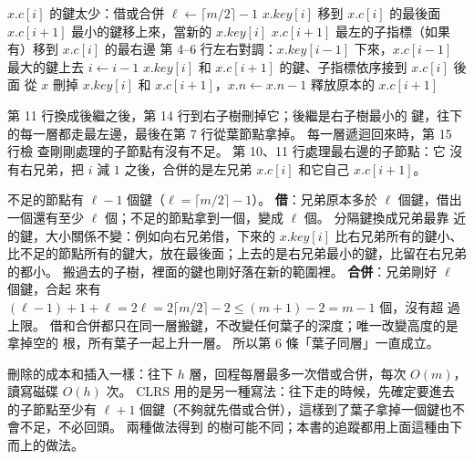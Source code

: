\begin{pseudo}[label=alg:mw-fix, unbreakable]{$x.c[i]$ 的鍵太少：借或合併}
    \State $\ell \gets \lceil m/2 \rceil - 1$
     
        \State $x.\mathit{key}[i]$ 移到 $x.c[i]$ 的最後面
        \State $x.c[i+1]$ 最小的鍵移上來，當新的 $x.\mathit{key}[i]$
        \State $x.c[i+1]$ 最左的子指標（如果有）移到 $x.c[i]$ 的最右邊
     
        \State 第 4--6 行左右對調：$x.\mathit{key}[i-1]$ 下來，$x.c[i-1]$ 最大的鍵上去
    \Else {}
            \State $i \gets i - 1$ 
        \EndIf
        \State $x.\mathit{key}[i]$ 和 $x.c[i+1]$ 的鍵、子指標依序接到 $x.c[i]$ 後面
        \State 從 $x$ 刪掉 $x.\mathit{key}[i]$ 和 $x.c[i+1]$，$x.n \gets x.n - 1$
        \State 釋放原本的 $x.c[i+1]$
    \EndIf
\EndProcedure
\end{pseudo}

 第 11 行換成後繼之後，第 14 行到右子樹刪掉它；後繼是右子樹最小的
鍵，往下的每一層都走最左邊，最後在第 7 行從葉節點拿掉。 每一層遞迴回來時，第 15 行檢
查剛剛處理的子節點有沒有不足。  第 10、11 行處理最右邊的子節點：它
沒有右兄弟，把 $i$ 減 $1$ 之後，合併的是左兄弟 $x.c[i]$ 和它自己 $x.c[i+1]$。

\begin{whybox}[借和合併之後仍然是 B 樹]
不足的節點有 $\ell - 1$ 個鍵（$\ell = \lceil m/2 \rceil - 1$）。 \textbf{借}：兄弟原本多於 $\ell$
個鍵，借出一個還有至少 $\ell$ 個；不足的節點拿到一個，變成 $\ell$ 個。 分隔鍵換成兄弟最靠
近的鍵，大小關係不變：例如向右兄弟借，下來的 $x.\mathit{key}[i]$ 比右兄弟所有的鍵小、
比不足的節點所有的鍵大，放在最後面；上去的是右兄弟最小的鍵，比留在右兄弟的都小。
搬過去的子樹，裡面的鍵也剛好落在新的範圍裡。 \textbf{合併}：兄弟剛好 $\ell$ 個鍵，合起
來有 $(\ell - 1) + 1 + \ell = 2\ell = 2\lceil m/2 \rceil - 2 \le (m + 1) - 2 = m - 1$ 個，沒有超
過上限。 借和合併都只在同一層搬鍵，不改變任何葉子的深度；唯一改變高度的是拿掉空的
根，所有葉子一起上升一層。 所以第 6 條「葉子同層」一直成立。
\end{whybox}

刪除的成本和插入一樣：往下 $h$ 層，回程每層最多一次借或合併，每次 $O(m)$，讀寫磁碟
$O(h)$ 次。 CLRS 用的是另一種寫法：往下走的時候，先確定要進去的子節點至少有 $\ell + 1$
個鍵（不夠就先借或合併），這樣到了葉子拿掉一個鍵也不會不足，不必回頭。 兩種做法得到
的樹可能不同；本書的追蹤都用上面這種由下而上的做法。

